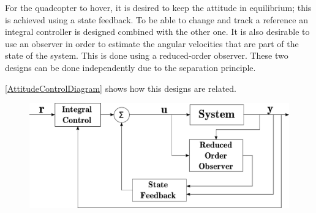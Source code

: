 For the quadcopter to hover, it is desired to keep the attitude in equilibrium; this is achieved using a state feedback. To be able to change and track a reference an integral controller is designed combined with the other one. It is also desirable to use an observer in order to estimate the angular velocities that are part of the state of the system. This is done using a reduced-order observer. These two designs can be done independently due to the separation principle. \cite{ssReference}

\autoref{AttitudeControlDiagram} shows how this designs are related.

\begin{figure}[H]
    \centering
    \includegraphics[scale=0.2]{figures/AttitudeControlDiagram}
    \caption{}
    \label{AttitudeControlDiagram}
\end{figure}














